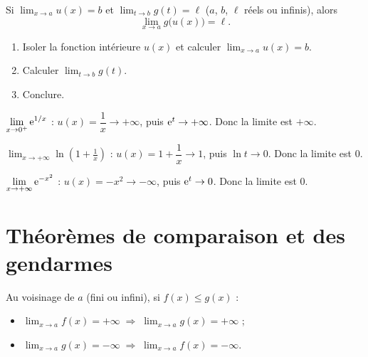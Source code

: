 \begin{theoreme}
	Si $\displaystyle\lim_{x\to a}u(x)=b$ et $\displaystyle\lim_{t\to b}g(t)=\ell$
	($a$, $b$, $\ell$ réels ou infinis), alors
	\[
	\lim_{x\to a}g\bigl(u(x)\bigr)=\ell .
	\]
\end{theoreme}

\begin{methode}
	\begin{enumerate}
		\item Isoler la fonction intérieure $u(x)$ et calculer $\displaystyle\lim_{x\to a}u(x)=b$.
		\item Calculer $\displaystyle\lim_{t\to b}g(t)$.
		\item Conclure.
	\end{enumerate}
\end{methode}

\begin{exemple}
	$\displaystyle\lim_{x\to 0^+}\mathrm{e}^{1/x}$ : $u(x)=\dfrac{1}{x}\to+\infty$,
	puis $\mathrm{e}^{t}\to+\infty$. Donc la limite est $+\infty$.
\end{exemple}

\begin{exemple}
	$\displaystyle\lim_{x\to+\infty}\ln\!\left(1+\frac{1}{x}\right)$ :
	$u(x)=1+\dfrac{1}{x}\to 1$, puis $\ln t\to 0$. Donc la limite est $0$.
\end{exemple}

\begin{exemple}
	$\displaystyle\lim_{x\to+\infty}\mathrm{e}^{-x^2}$ : $u(x)=-x^2\to-\infty$,
	puis $\mathrm{e}^{t}\to 0$. Donc la limite est $0$.
\end{exemple}


\section{Théorèmes de comparaison et des gendarmes}

\begin{theoreme}[Comparaison]
	Au voisinage de $a$ (fini ou infini), si $f(x)\leq g(x)$ :
	\begin{itemize}[label=\textbullet]
		\item $\displaystyle\lim_{x\to a}f(x)=+\infty
		\;\Longrightarrow\;\lim_{x\to a}g(x)=+\infty$ ;
		\item $\displaystyle\lim_{x\to a}g(x)=-\infty
		\;\Longrightarrow\;\lim_{x\to a}f(x)=-\infty$.
	\end{itemize}
\end{theoreme}


